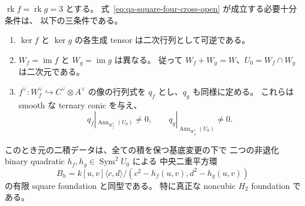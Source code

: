 \begin{proposition}[両階数三における有限認識]
\label{prop:qa-double-rank-three-conic-recognition}
$\operatorname{rk}f=\operatorname{rk}g=3$ とする。
式~\eqref{eq:qa-square-four-cross-open} が成立する必要十分条件は、
以下の三条件である。
\begin{enumerate}
\item $\ker f$ と $\ker g$ の各生成 tensor は二次行列として可逆である。
\item $W_f=\operatorname{im}f$ と $W_g=\operatorname{im}g$ は異なる。
      従って $W_f+W_g=W$、$U_0=W_f\cap W_g$ は二次元である。
\item $f^\vee:W_f^\vee\hookrightarrow C^\vee\otimes A^\vee$ の像の行列式を
      $q_f$ とし、$q_g$ も同様に定める。
      これらは smooth な ternary conic を与え、
      \[
       q_f|_{\operatorname{Ann}_{W_f^\vee}(U_0)}\ne0,
       \qquad
       q_g|_{\operatorname{Ann}_{W_g^\vee}(U_0)}\ne0.
      \]
\end{enumerate}
このとき元の二積データは、全ての積を保つ基底変更の下で
二つの非退化 binary quadratic $h_f,h_g\in\operatorname{Sym}^2U_0$ による
中央二重平方環
\[
 B_h=k[u,v]\langle c,d\rangle/(c^2-h_f(u,v),d^2-h_g(u,v))
\]
の有限 square foundation と同型である。
特に真正な noncubic $H_2$ foundation である。
\end{proposition}
